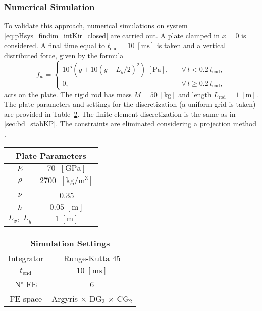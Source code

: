 \subsubsection{Numerical Simulation}
To validate this approach, numerical simulations on system \eqref{eq:pHsys_findim_intKir_closed} are carried out. A  plate clamped in $x=0$ is considered. A final time equal to $t_{\text{end}} = 10 \; \mathrm{[ms]}$ is taken and a vertical distributed force, given by the formula
\begin{equation}\label{eq:force_rod}
f_w = \begin{cases}
10^5 \left( y + 10 \left( y - L_y/2 \right)^2 \right) \; \mathrm{[Pa]}, \quad &\forall \, t < 0.2 \, t_{\text{end}}, \\
0, \quad &\forall \, t \ge 0.2 \, t_{\text{end}},
\end{cases}
\end{equation}
acts on the plate. The rigid rod has mass $M = 50 \; \mathrm{[kg]}$ and length $L_{\text{rod}} = 1 \; \mathrm{[m]}$. The plate parameters and settings for the discretization (a uniform grid is taken) are provided in Table~\ref{tab:parKirInt}. The finite element discretization is the same as in \ref{sec:bd_stabKP}.  The constraints are eliminated considering a projection method \cite{benner2015time}.

\begin{table}[hbt]
	\centering
	\begin{tabular}{|c|c|}
		\hline 
		\multicolumn{2}{|c|}{Plate Parameters} \\ 
		\hline 
		$E$ & $70\; \; \mathrm{[GPa]}$ \\ 
		$\rho$ & $2700\; \; \mathrm{[kg / m^3]}$ \\ 
		$\nu$& 0.35 \\ 
		$h$& $0.05\;  \mathrm{[m]}$ \\ 
		$L_x, \; L_y$& $1\;  \mathrm{[m]}$\\ 
		\hline 
	\end{tabular} \hspace{1cm}
	\begin{tabular}{|c|c|}
		\hline 
		\multicolumn{2}{|c|}{Simulation Settings} \\ 
		\hline 
		Integrator & Runge-Kutta 45 \\
		$t_{\text{end}}$ & $10 \; \mathrm{[ms]}$\\
		N$^\circ$ FE & 6 \\
		FE space & Argyris $\times$ DG$_3$ $\times$ CG$_2$\\
		\hline 
	\end{tabular} 
	\captionsetup{width=0.95\linewidth}
	\vspace{1mm}
	\label{tab:parKirInt}
\end{table}

